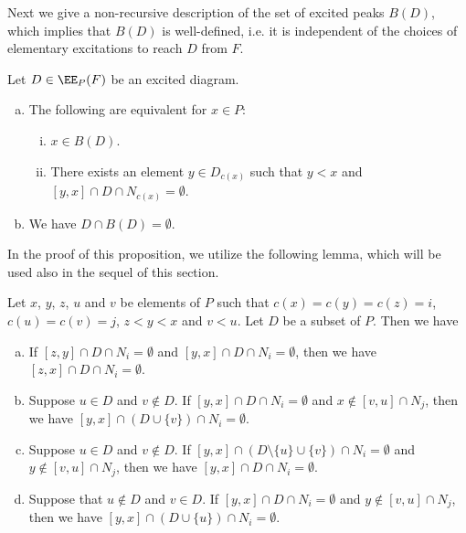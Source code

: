 Next we give a non-recursive description of the set of excited peaks $B(D)$, 
which implies that $B(D)$ is well-defined, i.e. 
it is independent of the choices of elementary excitations to reach $D$ from $F$.

\begin{prop}
\label{prop:BD}
Let $D \in \EE_P(F)$ be an excited diagram.
\begin{enumerate}[(a)]
\item\label{prop3.7_a} %
The following are equivalent for $x \in P$:
\begin{enumerate}[(i)]
\item\label{prop3.7_a_i} %
$x \in B(D)$.
\item\label{prop3.7_a_ii} %
There exists an element $y \in D_{c(x)}$ such that $y<x$ and $[y,x] \cap D \cap N_{c(x)} = \emptyset$.
\end{enumerate}
\item\label{prop3.7_b} %
We have $D \cap B(D) = \emptyset$.
\end{enumerate}
\end{prop}

In the proof of this proposition, we utilize the following lemma, 
which will be used also in the sequel of this section.

\begin{lemm}
\label{lem:interval}
Let $x$, $y$, $z$, $u$ and $v$ be elements of $P$ such that $c(x) = c(y) = c(z) = i$, 
$c(u) = c(v) = j$,
$z<y<x$ and $v<u$.
Let $D$ be a subset of $P$.
Then we have
\begin{enumerate}[(a)]
\item\label{lemma3.8_a} %
If $[z,y] \cap D \cap N_i = \emptyset$ and $[y,x] \cap D \cap N_i = \emptyset$, 
then we have $[z,x] \cap D \cap N_i = \emptyset$.
\item\label{lemma3.8_b} %
Suppose $u \in D$ and $v \not\in D$.
If $[y,x] \cap D \cap N_i = \emptyset$ and $x \not\in [v,u] \cap N_j$, 
then we have $[y,x] \cap (D \cup \{ v \}) \cap N_i = \emptyset$.
\item\label{lemma3.8_c} %
Suppose $u \in D$ and $v \not\in D$.
If $[y,x] \cap (D \setminus \{ u \} \cup \{ v \}) \cap N_i = \emptyset$ 
and $y \not\in [v,u] \cap N_j$, 
then we have $[y,x] \cap D \cap N_i = \emptyset$.
\item\label{lemma3.8_d} %
Suppose that $u \not\in D$ and $v \in D$.
If $[y,x] \cap D \cap N_i = \emptyset$ and $y \not\in [v,u] \cap N_j$, 
then we have $[y,x] \cap (D \cup \{ u \}) \cap N_i = \emptyset$.
\end{enumerate}
\end{lemm}

